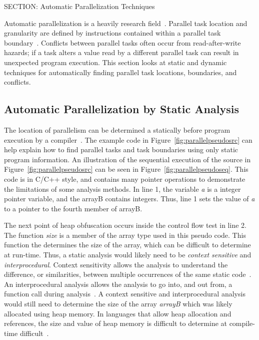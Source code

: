 {SECTION: Automatic Parallelization Techniques


Automatic parallelization is a heavily research field~\cite{hoeflinger:98:uiuccs, blume:1992:pds, Hall:2005wd}. Parallel task location and granularity are defined by instructions contained within a parallel task boundary~\cite{chen:1990:isca}. Conflicts between parallel tasks often occur from read-after-write hazards; if a task alters a value read by a different parallel task can result in unexpected program execution.  This section looks at static and dynamic techniques for automatically finding parallel task locations, boundaries, and conflicts.

\subsection{Automatic Parallelization by Static Analysis}

The location of parallelism can be determined a statically before program execution by a compiler~\cite{bringmann:95:uiuccs,dou:2007:trans}.  The example code in Figure~\ref{fig:parallelpseudosrc} can help explain how to find parallel tasks and task boundaries using only static program information.  An illustration of the sequential execution of the source in Figure~\ref{fig:parallelpseudosrc} can be seen in Figure~\ref{fig:parallelpseudoseq}.  This code is in C/C++ style, and contains many pointer operations to demonstrate the limitations of some analysis methods.  In line 1, the variable \textit{a} is a integer pointer variable, and the arrayB contains integers.  Thus, line 1 sets the value of \textit{a} to a pointer to the fourth member of arrayB.

The next point of heap obfuscation occurs inside the control flow test in line 2. The function \textit{size} is a member of the array type used in this pseudo code.  This function the determines the size of the array, which can be difficult to determine at run-time.  Thus, a static analysis would likely need to be \textit{context sensitive} and \textit{interprocedural}.  Context sensitivity allows the analysis to understand the difference, or similarities, between multiple occurrences of the same static code~\cite{emami:94:pldi}.  An interprocedural analysis allows the analysis to go into, and out from, a function call during analysis~\cite{allen:76:cacm}.  A context sensitive and interprocedural analysis would still need to determine the size of the array \textit{arrayB} which was likely allocated using heap memory.  In languages that allow heap allocation and references, the size and value of heap memory is difficult to determine at compile-time difficult~\cite{kong:91:test, muchnick:97:mkp, towle:76:uiuccs}.

}
